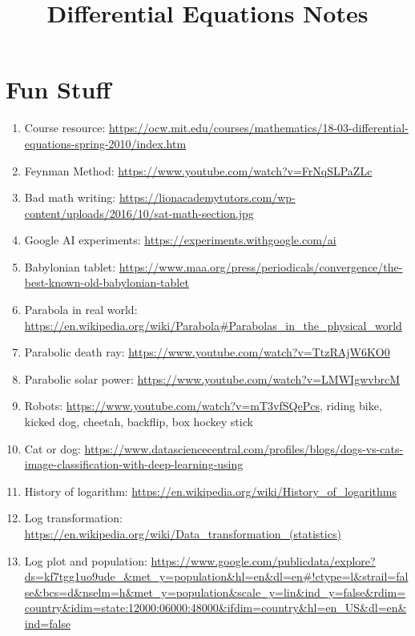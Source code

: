 \documentclass{article}
\title{Differential Equations Notes}
\date
\begin{document}
\maketitle
\large

\tableofcontents


\section{Fun Stuff}

\begin{enumerate}
\item Course resource: \url{https://ocw.mit.edu/courses/mathematics/18-03-differential-equations-spring-2010/index.htm}
\item Feynman Method: \url{https://www.youtube.com/watch?v=FrNqSLPaZLc}
\item Bad math writing: \url{https://lionacademytutors.com/wp-content/uploads/2016/10/sat-math-section.jpg}
\item Google AI experiments: \url{https://experiments.withgoogle.com/ai}
\item Babylonian tablet: \url{https://www.maa.org/press/periodicals/convergence/the-best-known-old-babylonian-tablet}
\item Parabola in real world: \url{https://en.wikipedia.org/wiki/Parabola#Parabolas_in_the_physical_world}
\item Parabolic death ray: \url{https://www.youtube.com/watch?v=TtzRAjW6KO0}
\item Parabolic solar power: \url{https://www.youtube.com/watch?v=LMWIgwvbrcM}
\item Robots: \url{https://www.youtube.com/watch?v=mT3vfSQePcs}, riding bike, kicked dog, cheetah, backflip, box hockey stick
\item Cat or dog: \url{https://www.datasciencecentral.com/profiles/blogs/dogs-vs-cats-image-classification-with-deep-learning-using}
\item History of logarithm: \url{https://en.wikipedia.org/wiki/History_of_logarithms}
\item Log transformation: \url{https://en.wikipedia.org/wiki/Data_transformation_(statistics)}
\item Log plot and population: \url{https://www.google.com/publicdata/explore?ds=kf7tgg1uo9ude_&met_y=population&hl=en&dl=en#!ctype=l&strail=false&bcs=d&nselm=h&met_y=population&scale_y=lin&ind_y=false&rdim=country&idim=state:12000:06000:48000&ifdim=country&hl=en_US&dl=en&ind=false} 

\end{enumerate}
\end{document}
